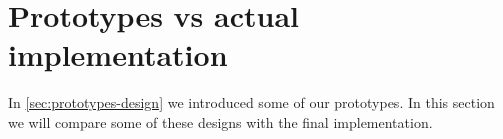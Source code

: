 \section{Prototypes vs actual implementation}
In \autoref{sec:prototypes-design} we introduced some of our prototypes.
In this section we will compare some of these designs with the final implementation.
